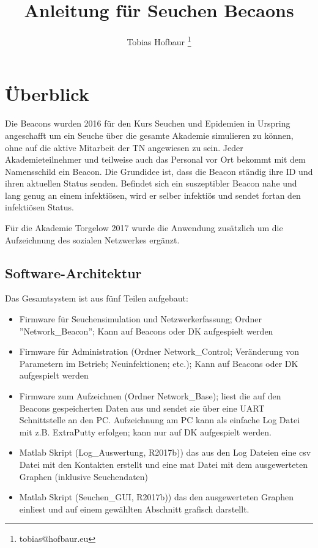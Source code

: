 \documentclass[11pt,ngerman]{scrartcl} %
\title{Anleitung für Seuchen Becaons}
\author{Tobias Hofbaur \footnote{tobias@hofbaur.eu}}
\begin{document}
\maketitle

\section{Überblick}
Die Beacons wurden 2016 für den Kurs Seuchen und Epidemien in Urspring angeschafft um ein Seuche über die gesamte Akademie simulieren zu können, ohne auf die aktive Mitarbeit der TN angewiesen zu sein. 
Jeder Akademieteilnehmer und teilweise auch das Personal vor Ort bekommt mit dem Namensschild ein Beacon. Die Grundidee ist, dass die Beacon ständig ihre ID und ihren aktuellen Status senden. Befindet sich ein suszeptibler Beacon nahe und lang genug an einem infektiösen, wird er selber infektiös und sendet fortan den infektiösen Status.

Für die Akademie Torgelow 2017 wurde die Anwendung zusätzlich um die Aufzeichnung des sozialen Netzwerkes ergänzt.


\subsection{Software-Architektur}
Das Gesamtsystem ist aus fünf Teilen aufgebaut:
\begin{itemize}
\item Firmware  für Seuchensimulation und Netzwerkerfassung; Ordner ''Network\_Beacon''; Kann auf Beacons oder DK aufgespielt werden
\item Firmware für Administration (Ordner Network\_Control; Veränderung von Parametern im Betrieb; Neuinfektionen; etc.);  Kann auf Beacons oder DK aufgespielt werden
\item Firmware zum Aufzeichnen (Ordner Network\_Base); liest die auf den Beacons gespeicherten Daten aus und sendet sie über eine UART Schnittstelle an den PC. Aufzeichnung am PC kann als einfache Log Datei mit z.B. ExtraPutty erfolgen; kann nur auf DK aufgespielt werden.
\item  Matlab Skript (Log\_Auswertung, R2017b)) das aus den Log Dateien eine csv Datei mit den Kontakten erstellt und eine mat Datei mit dem ausgewerteten Graphen (inklusive Seuchendaten)
\item  Matlab Skript (Seuchen\_GUI, R2017b)) das den ausgewerteten Graphen einliest und auf einem gewählten Abschnitt grafisch darstellt.
\end{itemize}
\end{document}
